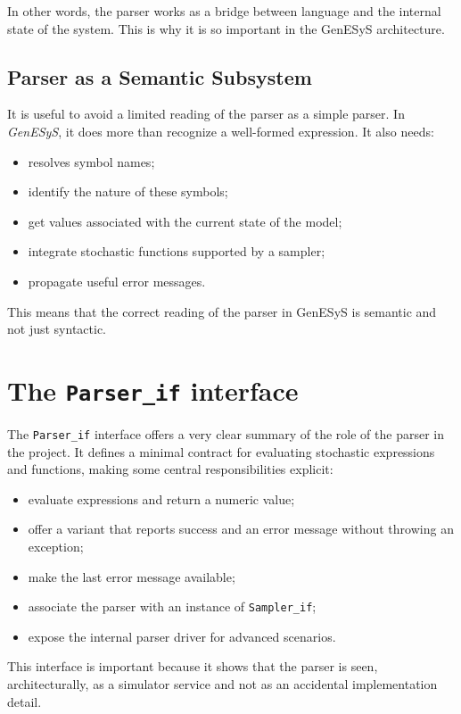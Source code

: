 In other words, the parser works as a bridge between language and the internal state of the system. This is why it is so important in the GenESyS architecture.

\subsection{Parser as a Semantic Subsystem}
\label{subsec:cap9_parser_como_subsistema_semantico}

It is useful to avoid a limited reading of the parser as a simple parser. In \textit{GenESyS}, it does more than recognize a well-formed expression. It also needs:
\begin{itemize}
 \item resolves symbol names;
 \item identify the nature of these symbols;
 \item get values ​​associated with the current state of the model;
 \item integrate stochastic functions supported by a sampler;
 \item propagate useful error messages.
\end{itemize}

This means that the correct reading of the parser in GenESyS is semantic and not just syntactic.

\section{The \texttt{Parser\_if} interface}
\label{sec:cap9_interface_parser_if}

The \texttt{Parser\_if} interface offers a very clear summary of the role of the parser in the project. It defines a minimal contract for evaluating stochastic expressions and functions, making some central responsibilities explicit:
\begin{itemize}
 \item evaluate expressions and return a numeric value;
 \item offer a variant that reports success and an error message without throwing an exception;
 \item make the last error message available;
 \item associate the parser with an instance of \texttt{Sampler\_if};
 \item expose the internal parser driver for advanced scenarios.
\end{itemize}

This interface is important because it shows that the parser is seen, architecturally, as a simulator service and not as an accidental implementation detail.

